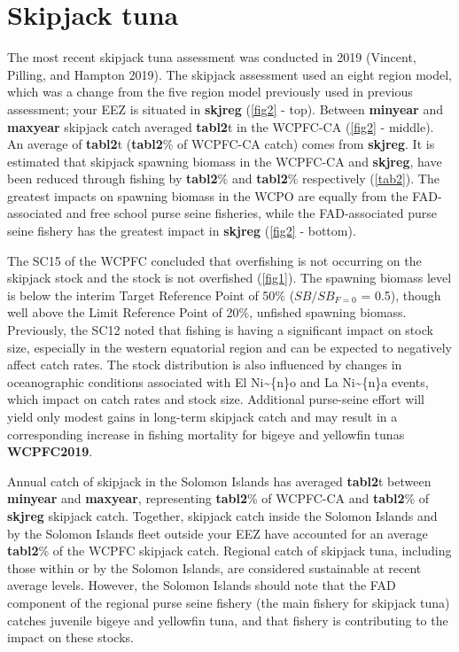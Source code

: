 \documentclass[
]{article}
\begin{document}
\hypertarget{skipjack-tuna}{%
\section{Skipjack tuna}\label{skipjack-tuna}}

The most recent skipjack tuna assessment was conducted in 2019 (Vincent,
Pilling, and Hampton 2019). The skipjack assessment used an eight region
model, which was a change from the five region model previously used in
previous assessment; your EEZ is situated in \textbf{skjreg}
(\autoref{fig2} - top). Between \textbf{minyear} and \textbf{maxyear}
skipjack catch averaged \textbf{tabl2}t in the WCPFC-CA (\autoref{fig2}
- middle). An average of \textbf{tabl2}t (\textbf{tabl2}\% of WCPFC-CA
catch) comes from \textbf{skjreg}. It is estimated that skipjack
spawning biomass in the WCPFC-CA and \textbf{skjreg}, have been reduced
through fishing by \textbf{tabl2}\% and \textbf{tabl2}\% respectively
(\autoref{tab2}). The greatest impacts on spawning biomass in the WCPO
are equally from the FAD-associated and free school purse seine
fisheries, while the FAD-associated purse seine fishery has the greatest
impact in \textbf{skjreg} (\autoref{fig2} - bottom).

The SC15 of the WCPFC concluded that overfishing is not occurring on the
skipjack stock and the stock is not overfished (\autoref{fig1}). The
spawning biomass level is below the interim Target Reference Point of
50\% (\(SB/SB_{F=0}\) = 0.5), though well above the Limit Reference
Point of 20\%, unfished spawning biomass. Previously, the SC12 noted
that fishing is having a significant impact on stock size, especially in
the western equatorial region and can be expected to negatively affect
catch rates. The stock distribution is also influenced by changes in
oceanographic conditions associated with El Ni\textasciitilde\{n\}o and
La Ni\textasciitilde\{n\}a events, which impact on catch rates and stock
size. Additional purse-seine effort will yield only modest gains in
long-term skipjack catch and may result in a corresponding increase in
fishing mortality for bigeye and yellowfin tunas \textbf{WCPFC2019}.

Annual catch of skipjack in the Solomon Islands has averaged
\textbf{tabl2}t between \textbf{minyear} and \textbf{maxyear},
representing \textbf{tabl2}\% of WCPFC-CA and \textbf{tabl2}\% of
\textbf{skjreg} skipjack catch. Together, skipjack catch inside the
Solomon Islands and by the Solomon Islands fleet outside your EEZ have
accounted for an average \textbf{tabl2}\% of the WCPFC skipjack catch.
Regional catch of skipjack tuna, including those within or by the
Solomon Islands, are considered sustainable at recent average levels.
However, the Solomon Islands should note that the FAD component of the
regional purse seine fishery (the main fishery for skipjack tuna)
catches juvenile bigeye and yellowfin tuna, and that fishery is
contributing to the impact on these stocks.
\end{document}
